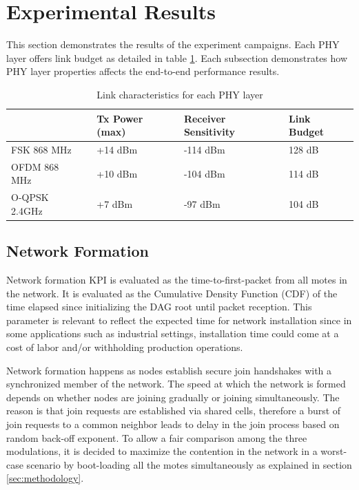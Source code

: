 \documentclass[journal]{IEEEtran}
\newcommand{\fsk}          {FSK 868 MHz}
\newcommand{\oqpsk}        {O-QPSK 2.4GHz}
\newcommand{\ofdm}         {OFDM 868 MHz}
\begin{document}
\section{Experimental Results}
\label{sec:results}

This section demonstrates the results of the experiment campaigns.
Each PHY layer offers link budget as detailed in table \ref{tab:linkbudget}. 
Each subsection demonstrates how PHY layer properties affects the end-to-end performance results. 

\begin{table}[t]
\centering
\caption{Link characteristics for each PHY layer}
\begin{tabular}{|l|l|l|l|}
\hline
        &  Tx Power (max) & Receiver Sensitivity & Link Budget \\ \hline
\fsk\   & +14 dBm      & -114 dBm             & 128 dB      \\ \hline
\ofdm\  & +10 dBm      & -104 dBm             & 114 dB      \\ \hline
\oqpsk\ & +7 dBm       & -97 dBm              & 104 dB      \\ \hline
\end{tabular}
\label{tab:linkbudget}
\end{table}

\subsection{Network Formation}
\label{sec:network_formation}


Network formation KPI is evaluated as the time-to-first-packet  from all motes in the network.
It is evaluated as the Cumulative Density Function (CDF) of the time elapsed since initializing the DAG root until packet reception. 
This parameter is relevant to reflect the expected time for network installation since in some applications such as industrial settings, installation time could come at a cost of labor and/or withholding production operations.

Network formation happens as nodes establish secure join handshakes with a synchronized member of the network.
The speed at which the network is formed depends on whether nodes are joining gradually or joining simultaneously.
The reason is that join requests are established via shared cells, therefore a burst of join requests to a common neighbor leads to delay in the join process based on random back-off exponent. 
To allow a fair comparison among the three modulations, it is decided to maximize the contention in the network in a worst-case scenario by boot-loading all the motes simultaneously as explained in section \ref{sec:methodology}.
\end{document}
